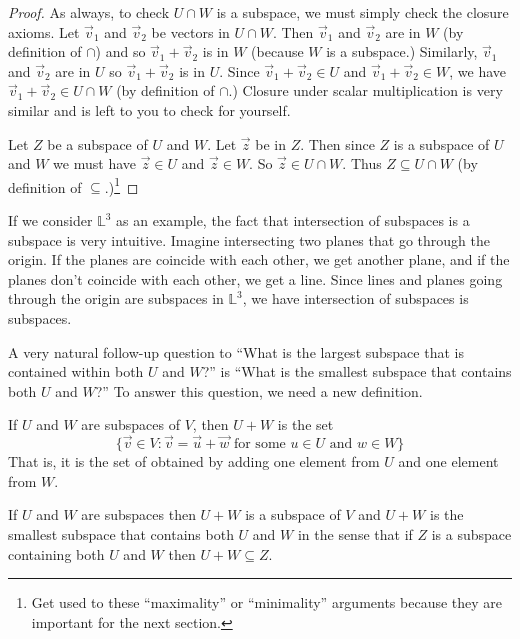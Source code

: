 \begin{proof}
	As always, to check $U \cap W$ is a subspace, we must simply check the closure axioms. Let $\vec{v}_1$ and $\vec{v}_2$ be vectors in $U \cap W$. Then $\vec{v}_1$ and $\vec{v}_2$ are in $W$ (by definition of $\cap$) and so $\vec{v}_1 + \vec{v}_2$ is in $W$ (because $W$ is a subspace.) Similarly, $\vec{v}_1$ and $\vec{v}_2$ are in $U$ so $\vec{v}_1+\vec{v}_2$ is in $U$. Since $\vec{v}_1 + \vec{v}_2 \in U$ and $\vec{v}_1+\vec{v}_2 \in W$, we have $\vec{v}_1 + \vec{v}_2 \in U \cap W$ (by definition of $\cap$.) Closure under scalar multiplication is very similar and is left to you to check for yourself.
		
	Let $Z$ be a subspace of $U$ and $W$. Let $\vec{z}$ be in $Z$. Then since $Z$ is a subspace of $U$ and $W$ we must have $\vec{z} \in U$ and $\vec{z} \in W$. So $\vec{z} \in U \cap W$. Thus $Z \subseteq U \cap W$ (by definition of $\subseteq$.)\footnote{Get used to these ``maximality'' or ``minimality'' arguments because they are important for the next section.}
\end{proof}

If we consider $\mathbb{L}^3$ as an example, the fact that intersection of subspaces is a subspace is very intuitive. Imagine intersecting two planes that go through the origin. If the planes are coincide with each other, we get another plane, and if the planes don't coincide with each other, we get a line. Since lines and planes going through the origin are subspaces in $\mathbb{L}^3$, we have intersection of subspaces is subspaces.

A very natural follow-up question to ``What is the largest subspace that is contained within both $U$ and $W$?'' is ``What is the smallest subspace that contains both $U$ and $W$?'' To answer this question, we need a new definition.

\begin{definition}
	If $U$ and $W$ are subspaces of $V$, then $U + W$ is the set
	$$\{ \vec{v} \in V : \vec{v} = \vec{u} + \vec{w} \text{ for some } u \in U \text{ and } w \in W \}$$
	That is, it is the set of obtained by adding one element from $U$ and one element from $W$.
\end{definition}

\begin{theorem}\label{thm:addsubspaces}
	If $U$ and $W$ are subspaces then $U + W$ is a subspace of $V$ and $U+W$ is the smallest subspace that contains both $U$ and $W$ in the sense that if $Z$ is a subspace containing both $U$ and $W$ then $U + W \subseteq Z$.
\end{theorem}

